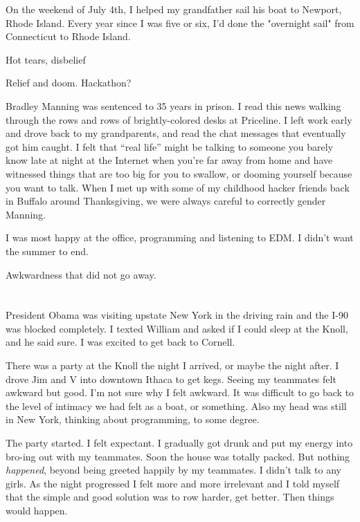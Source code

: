 \documentclass[12pt]{memoir}
\begin{document}
On the weekend of July 4th, I helped my grandfather sail his boat to Newport,
Rhode Island.  Every year since I was five or six, I'd done the "overnight sail"
from Connecticut to Rhode Island.  

Hot tears, disbelief

Relief and doom. 
Hackathon?

Bradley Manning was sentenced to 35 years in prison.  I read this news walking
through the rows and rows of brightly-colored desks at Priceline.  I left work
early and drove back to my grandparents, and read the chat messages that
eventually got him caught.   I felt that ``real life'' might be talking to
someone you barely know late at night at the Internet when you're far away from
home and have witnessed things that are too big for you to swallow, or dooming
yourself because you want to talk.  When I met up with some of my childhood
hacker friends back in Buffalo around Thanksgiving, we were always careful to
correctly gender Manning.  

I was most happy at the office, programming and listening to EDM.  I didn't want
the summer to end.


Awkwardness that did not go away.

\section{}

President Obama was visiting upstate New York in the driving rain and the I-90
was blocked completely.  I texted William and asked if I could sleep at the
Knoll, and he said sure.  I was excited to get back to Cornell.


There was a party at the Knoll the night I arrived, or maybe the night after.  I
drove Jim and V into downtown Ithaca to get kegs.  Seeing my teammates felt
awkward but good.  I'm not sure why I felt awkward.  It was difficult to go back
to the level of intimacy we had felt as a boat, or something.  Also my head was
still in New York, thinking about programming, to some degree.    

The party started.  I felt expectant.  I gradually got drunk and put my energy
into bro-ing out with my teammates.  Soon the house was totally packed.  But
nothing \textit{happened}, beyond being greeted happily by my teammates.  I
didn't talk to any girls.  As the night progressed I felt more and more
irrelevant and I told myself that the simple and good solution was to row
harder, get better.  Then things would happen.
\end{document}
